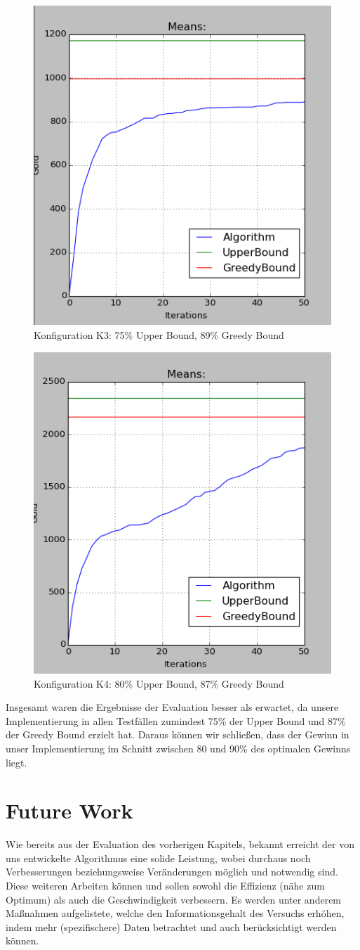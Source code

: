 \documentclass[fleqn,10pt]{SelfArx} %
\begin{document}
\label{fig:eval2}
\begin{figure}
  \centering
  \includegraphics[width=.4\textwidth]{10ad_15ag_50r_50it_cut.png}
  \caption{Konfiguration K3: 75\% Upper Bound, 89\% Greedy Bound}
\end{figure}
\label{fig:eval3}
\begin{figure}
  \centering
  \includegraphics[width=.4\textwidth]{20ad_15ag_50r_50it_cut.png}
  \caption{Konfiguration K4: 80\% Upper Bound, 87\% Greedy Bound}
\end{figure}
\label{fig:eval4}
Insgesamt waren die Ergebnisse der Evaluation besser als erwartet, da unsere Implementierung in allen Testfällen zumindest 75\% der Upper Bound und 87\% der Greedy Bound erzielt hat. Daraus können wir schließen, dass der Gewinn in unser Implementierung im Schnitt zwischen 80 und 90\% des optimalen Gewinns liegt.
\section{Future Work}
\label{sec:Future}

Wie bereits aus der Evaluation des vorherigen Kapitels, bekannt erreicht der von uns entwickelte Algorithmus eine solide Leistung, wobei durchaus noch Verbesserungen beziehungsweise Veränderungen möglich und notwendig sind. Diese weiteren Arbeiten können und sollen sowohl die Effizienz (nähe zum Optimum) als auch die Geschwindigkeit verbessern. Es werden unter anderem Maßnahmen aufgelistete, welche den Informationsgehalt des Versuchs erhöhen, indem mehr (spezifischere) Daten betrachtet und auch berücksichtigt werden können.
\end{document}
